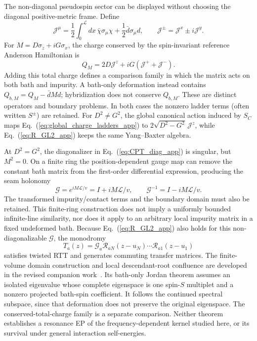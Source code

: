 \documentclass[%
  aps,physrev,onecolumn,10pt,amsmath,amssymb,superscriptaddress,longbibliography,floatfix
]{revtex4-2}
\begin{document}
The non-diagonal pseudospin sector can be displayed without choosing
the diagonal positive-metric frame.  Define
\begin{equation}
\mathcal J^\mu
=\frac12\int_0^{\mathcal L}dx\,\bar\chi\sigma_\mu\chi
 +\frac12\bar d\sigma_\mu d,\qquad
\mathcal J^\pm=\mathcal J^x\pm i\mathcal J^y .
\label{eq:global_ladders_app}
\end{equation}
For \(M=D\sigma_z+iG\sigma_x\), the charge conserved by the
spin-invariant reference Anderson Hamiltonian is
\begin{equation}
Q_M
=2D\mathcal J^z+iG(\mathcal J^++\mathcal J^-).
\label{eq:global_charge_ladders_app}
\end{equation}
Adding this total charge defines a comparison family in which the matrix
acts on both bath and impurity. A bath-only deformation instead contains
$Q_{b,M}=Q_M-\bar d M d$; hybridization does not conserve $Q_{b,M}$.
These are distinct operators and boundary problems. In both cases the
nonzero ladder terms (often written \(S^\pm\)) are retained.  For \(D^2\ne G^2\), the global canonical action
induced by \(S_C\) maps Eq.~(\ref{eq:global_charge_ladders_app}) to
\(2\sqrt{D^2-G^2}\,\mathcal J^z\), while
Eq.~(\ref{eq:R_GL2_app}) keeps the same Yang--Baxter algebra.

At \(D^2=G^2\), the diagonalizer in Eq.~(\ref{eq:CPT_diag_app}) is singular,
but \(M^2=0\).  On a finite ring the position-dependent gauge map can
remove the constant bath matrix from the first-order differential
expression, producing the seam holonomy
\begin{equation}
\mathcal G=e^{iM\mathcal L/v}=I+iM\mathcal L/v,
\qquad \mathcal G^{-1}=I-iM\mathcal L/v .
\label{eq:unipotent_twist_app}
\end{equation}
The transformed impurity/contact terms and the boundary domain must also
be retained.  This finite-ring construction does not imply a uniformly
bounded infinite-line similarity, nor does it apply to an arbitrary local
impurity matrix in a fixed undeformed bath.  Because
Eq.~(\ref{eq:R_GL2_app}) also holds for this non-diagonalizable
\(\mathcal G\), the monodromy
\begin{equation}
T_a(z)=\mathcal G_a
\mathcal R_{aN}(z-u_N)\cdots\mathcal R_{a1}(z-u_1)
\label{eq:twisted_monodromy_app}
\end{equation}
satisfies twisted RTT and generates commuting transfer matrices.  The
finite-volume domain construction and local descendant-root confluence are
developed in the revised companion work~\cite{KulkarniYB2026}. Its bath-only
Jordan theorem assumes an isolated eigenvalue whose complete eigenspace is
one spin-$S$ multiplet and a nonzero projected bath-spin coefficient. It
follows the continued spectral subspace, since that deformation does not
preserve the original eigenspace. The conserved-total-charge family is a
separate comparison. Neither theorem establishes a resonance EP of the
frequency-dependent kernel studied here, or its survival under general
interaction self-energies.
\end{document}
